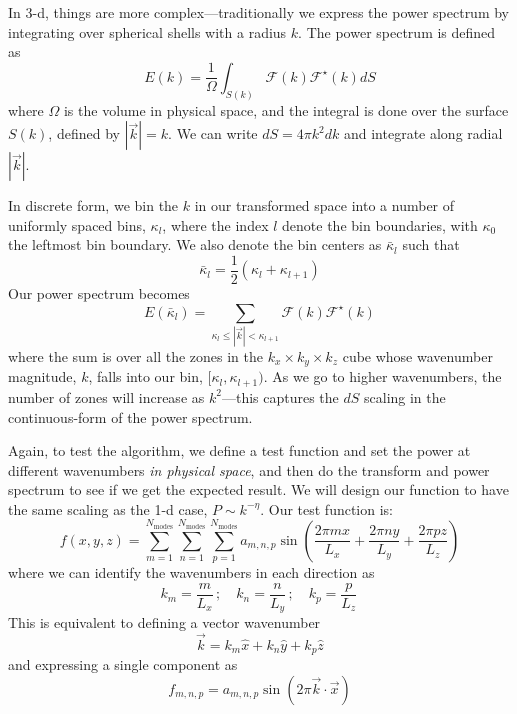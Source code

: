\documentclass[11pt]{article}
\begin{document}
In 3-d, things are more complex---traditionally we express the power
spectrum by integrating over spherical shells with a radius $k$.  The
power spectrum is defined as
\begin{equation}
E(k) = \frac{1}{\Omega} \int_{S(k)} \mathcal{F}(k) \mathcal{F}^\star(k) dS
\end{equation}
where $\Omega$ is the volume in physical space, and the integral is done
over the surface $S(k)$, defined by $|\vec{k}| = k$.  We can
write $dS = 4\pi k^2 dk$ and integrate along radial $|\vec{k}|$.

In discrete form, we bin the $k$ in our transformed space into a
number of uniformly spaced bins, $\kappa_l$, where the index
$l$ denote the bin boundaries, with $\kappa_0$ the leftmost bin boundary.
We also denote the bin centers as $\bar{\kappa}_l$ such that
\begin{equation}
\bar{\kappa}_l = \frac{1}{2} ( \kappa_l + \kappa_{l+1} )
\end{equation}
Our power spectrum becomes
\begin{equation}
E(\bar{\kappa}_l) = \sum_{\kappa_{l} \le |\vec{k}| < \kappa_{l+1}}
   \mathcal{F}(k) \mathcal{F}^\star(k)
\end{equation}
where the sum is over all the zones in the $k_x \times k_y \times k_z$
cube whose wavenumber magnitude, $k$, falls into our bin,
$[\kappa_l,\kappa_{l+1})$.  As we go to higher wavenumbers, the number
  of zones will increase as $k^2$---this captures the $dS$ scaling in
  the continuous-form of the power spectrum.


Again, to test the algorithm, we define a test function and set the power at
different wavenumbers {\em in physical space}, and then do the transform
and power spectrum to see if we get the expected result.  We will design
our function to have the same scaling as the 1-d case, $P \sim k^{-\eta}$.
Our test function
is:
\begin{equation}
f(x,y,z) = \sum_{m=1}^{N_\mathrm{modes}} 
              \sum_{n=1}^{N_\mathrm{modes}} 
              \sum_{p=1}^{N_\mathrm{modes}} 
     a_{m,n,p} \sin \left ( \frac{2\pi m x}{L_x} + 
                            \frac{2\pi n y}{L_y} + 
                            \frac{2\pi p z}{L_z} \right )
\end{equation}
where we can identify the wavenumbers in each direction as
\begin{equation}
k_m = \frac{m}{L_x} \, ; \quad 
k_n = \frac{n}{L_y} \, ; \quad 
k_p = \frac{p}{L_z} \,
\end{equation}
This is equivalent to defining a vector wavenumber
\begin{equation}
\vec{k} = k_m \hat{x} + k_n \hat{y} + k_p \hat{z}
\end{equation}
and expressing a single component as
\begin{equation}
f_{m,n,p} = a_{m,n,p} \sin(2\pi \vec{k}\cdot \vec{x})
\end{equation}
\end{document}
